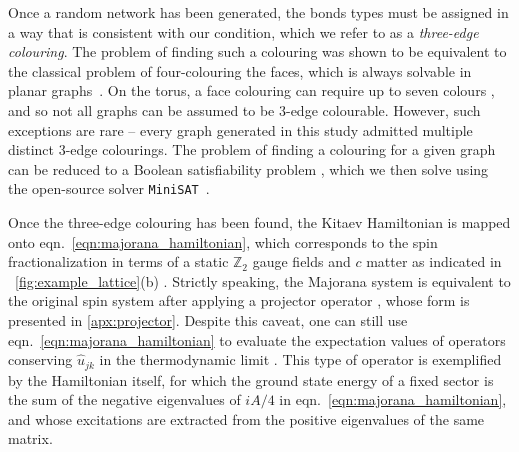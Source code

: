\documentclass[%
 reprint,
superscriptaddress,
 amsmath,amssymb,
aps,
]{revtex4-2}
\begin{document}
Once a random network has been generated, the bonds types must be assigned in a way that is consistent with our condition, which we refer to as a \textit{three-edge colouring}. The problem of finding such a colouring was shown to be equivalent to the classical problem of four-colouring the faces, which is always solvable in planar graphs~\cite{Tait1880, appelEveryPlanarMap1989a}. On the torus, a face colouring can require up to seven colours \cite{ringel_solution_1968}, and so not all graphs can be assumed to be 3-edge colourable. However, such exceptions are rare -- every graph generated in this study admitted multiple distinct 3-edge colourings. The problem of finding a colouring for a given graph can be reduced to a Boolean satisfiability problem \cite{Karp1972}, which we then solve using the open-source solver \texttt{MiniSAT}~\cite{imms-sat18}. \par
Once the three-edge colouring has been found, the Kitaev Hamiltonian is mapped onto eqn.~\ref{eqn:majorana_hamiltonian}, which corresponds to the spin fractionalization in terms of a static $\mathbb Z_2$ gauge fields and $c$ matter as indicated in ~\cref{fig:example_lattice}(b) \cite{Baskaran2007}.  Strictly speaking, the Majorana system is equivalent to the original spin system after applying a projector operator \cite{pedrocchiPhysicalSolutionsKitaev2011,Zschocke_Physical_states2015,selfThermallyInducedMetallic2019}, whose form is presented in \cref{apx:projector}. Despite this caveat, one can still use eqn.~\ref{eqn:majorana_hamiltonian} to evaluate the expectation values of operators conserving $\hat u_{jk}$ in the thermodynamic limit \cite{Yao2009,knolle_dynamics_2016}. This type of operator is exemplified by the Hamiltonian itself, for which the ground state energy of a fixed sector is the sum of the negative eigenvalues of $iA/4$ in eqn.~\ref{eqn:majorana_hamiltonian}, and whose excitations are extracted from the positive eigenvalues of the same matrix. 
\end{document}
